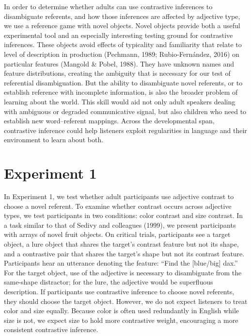 \documentclass[10pt, letterpaper]{article}
\begin{document}
In order to determine whether adults can use contrastive inferences to
disambiguate referents, and how those inferences are affected by
adjective type, we use a reference game with novel objects. Novel
objects provide both a useful experimental tool and an especially
interesting testing ground for contrastive inferences. These objects
avoid effects of typicality and familiarity that relate to level of
description in production (Pechmann, 1989; Rubio-Fernández, 2016) on
particular features (Mangold \& Pobel, 1988). They have unknown names
and feature distributions, creating the ambiguity that is necessary for
our test of referential disambiguation. But the ability to disambiguate
novel referents, or to establish reference with incomplete information,
is also the broader problem of learning about the world. This skill
would aid not only adult speakers dealing with ambiguous or degraded
communicative signal, but also children who need to establish new
word--referent mappings. Across the developmental span, contrastive
inference could help listeners exploit regularities in language and
their environment to learn about both.

\section{Experiment 1}\label{experiment-1}

In Experiment 1, we test whether adult participants use adjective
contrast to choose a novel referent. To examine whether contrast occurs
across adjective types, we test participants in two conditions: color
contrast and size contrast. In a task similar to that of Sedivy and
colleagues (1999), we present participants with arrays of novel fruit
objects. On critical trials, participants see a target object, a lure
object that shares the target's contrast feature but not its shape, and
a contrastive pair that shares the target's shape but not its contrast
feature. Participants hear an utterance denoting the feature: ``Find the
{[}blue/big{]} dax.'' For the target object, use of the adjective is
necessary to disambiguate from the same-shape distractor; for the lure,
the adjective would be superfluous description. If participants use
contrastive inference to choose novel referents, they should choose the
target object. However, we do not expect listeners to treat color and
size equally. Because color is often used redundantly in English while
size is not, we expect size to hold more contrastive weight, encouraging
a more consistent contrastive inference.
\end{document}
